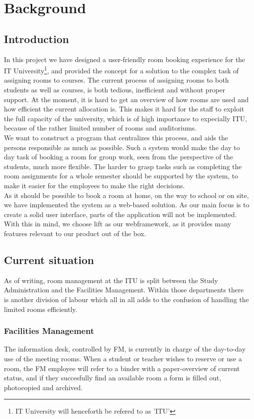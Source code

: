 \chapter{Background}
\section{Introduction}
In this project we have designed a user-friendly room booking experience for the IT University\footnote{IT University will henceforth be refered to as 'ITU'}, and provided the concept for a solution to the complex task of assigning rooms to courses. The current process of assigning rooms to both students as well as courses, is both tedious, inefficient and without proper support. At the moment, it is hard to get an overview of how rooms are used and how efficient the current allocation is. This makes it hard for the staff to exploit the full capacity of the university, which is of high importance to expecially ITU, because of the rather limited number of rooms and auditoriums. \\

We want to construct a program that centralizes this process, and aids the persons responsible as much as possible. Such a system would make the day to day task of booking a room for group work, seen from the perspective of the students, much more flexible. The harder to grasp tasks such as completing the room assignments for a whole semester should be supported by the system, to make it easier for the employees to make the right decisions.\\ As it should be possible to book a room at home, on the way to school or on site, we have implemented the system as a web-based solution. As our main focus is to create a solid user interface, parts of the application will not be implemented. With this in mind, we choose lift as our webframework, as it provides many features relevant to our product out of the box. 

\pagebreak
\label{sec:current_situation}
\section{Current situation}
As of writing, room management at the ITU is split between the Study Administration and the Facilities Management. Within those departments there is another division of labour which all in all adds to the confusion of handling the limited rooms efficiently.

\subsection{Facilities Management}
The information desk, controlled by FM, is currently in charge of the day-to-day use of the meeting rooms. When a student or teacher wishes to reserve or use a room, the FM employee will refer to a binder with a paper-overview of current status, and if they succesfully find an available room a form is filled out, photocopied and archived.

